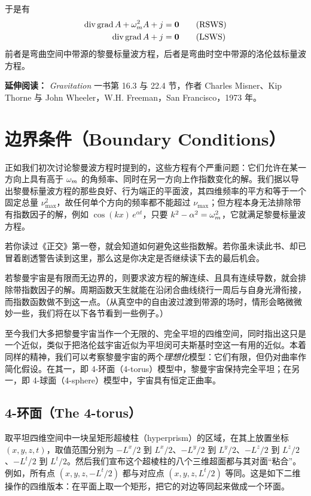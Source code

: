于是有
\begin{align}
\operatorname{div}\operatorname{grad} A + \omega_m^{2} A + j &= \mathbf{0} \tag{RSWS}\\
\operatorname{div}\operatorname{grad} A + j &= \mathbf{0} \tag{LSWS}
\end{align}
前者是弯曲空间中带源的黎曼标量波方程，后者是弯曲时空中带源的洛伦兹标量波方程。

\medskip
\noindent\textbf{延伸阅读：} \emph{Gravitation} 一书第 16.3 与 22.4 节，作者 Charles Misner、Kip Thorne 与 John Wheeler，W.H. Freeman，San Francisco，1973 年。

\section{边界条件（Boundary Conditions）}

正如我们初次讨论黎曼波方程时提到的，这些方程有个严重问题：它们允许在某一方向上具有高于 $\omega_m$ 的角频率、同时在另一方向上作指数变化的解。我们据以导出黎曼标量波方程的那些良好、行为端正的平面波，其四维频率的平方和等于一个固定总量 $\nu_{\max}^{2}$，故任何单个方向的频率都不能超过 $\nu_{\max}$；但方程本身无法排除带有指数因子的解，例如 $\cos(kx)\,e^{\alpha t}$，只要 $k^{2}-\alpha^{2}=\omega_m^{2}$，它就满足黎曼标量波方程。

若你读过《正交》第一卷，就会知道如何避免这些指数解。若你虽未读此书、却已冒着剧透警告读到这里，那么这是你决定是否继续读下去的最后机会。

若黎曼宇宙是有限而无边界的，则要求波方程的解连续、且具有连续导数，就会排除带指数因子的解。周期函数天生就能在沿闭合曲线绕行一周后与自身光滑衔接，而指数函数做不到这一点。（从真空中的自由波过渡到带源的场时，情形会略微微妙一些，我们将在以下各节看到一些例子。）

至今我们大多把黎曼宇宙当作一个无限的、完全平坦的四维空间，同时指出这只是一个近似，类似于把洛伦兹宇宙近似为平坦闵可夫斯基时空这一有用的近似。本着同样的精神，我们可以考察黎曼宇宙的两个\emph{理想化}模型：它们有限，但仍对曲率作简化假设。在其一，即 4-环面（4-torus）模型中，黎曼宇宙保持完全平坦；在另一，即 4-球面（4-sphere）模型中，宇宙具有恒定正曲率。

\subsection{4-环面（The 4-torus）}

取平坦四维空间中一块呈矩形超棱柱（hyperprism）的区域，在其上放置坐标 $(x,y,z,t)$，取值范围分别为 $-L^{x}/2$ 到 $L^{x}/2$、$-L^{y}/2$ 到 $L^{y}/2$、$-L^{z}/2$ 到 $L^{z}/2$、$-L^{t}/2$ 到 $L^{t}/2$。然后我们宣布这个超棱柱的八个三维超面都与其对面“粘合”。例如，所有点 $(x,y,z,-L^{t}/2)$ 都与对应点 $(x,y,z,L^{t}/2)$ 等同。这是如下二维操作的四维版本：在平面上取一个矩形，把它的对边等同起来做成一个环面。

